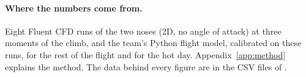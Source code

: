 \paragraph{Where the numbers come from.} Eight Fluent CFD runs of the two noses (2D, no angle of attack)
at three moments of the climb, and the team's Python flight model, calibrated on these runs, for the
rest of the flight and for the hot day. Appendix~\ref{app:method} explains the method. The data behind
every figure are in the CSV files of .
